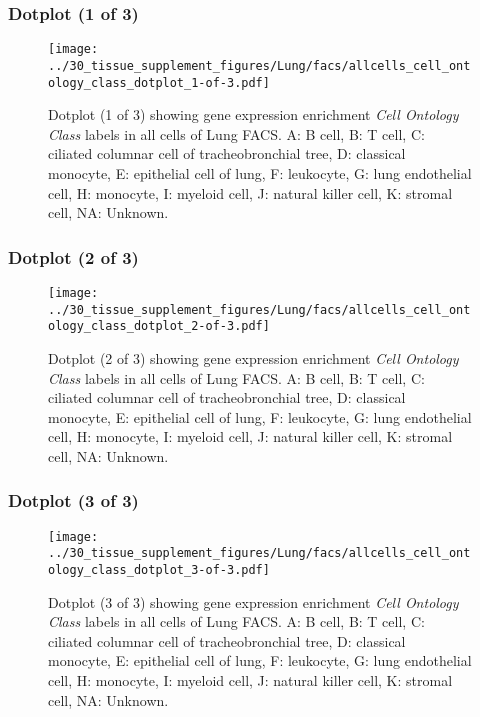 \clearpage

\subsubsection{Dotplot (1 of 3)}
\begin{figure}[h]
\centering
\texttt{[image: ../30\_tissue\_supplement\_figures/Lung/facs/allcells\_cell\_ontology\_class\_dotplot\_1-of-3.pdf]}

\caption{ Dotplot (1 of 3)  showing gene expression enrichment \emph{Cell Ontology Class} labels in all cells of Lung FACS. A: B cell, B: T cell, C: ciliated columnar cell of tracheobronchial tree, D: classical monocyte, E: epithelial cell of lung, F: leukocyte, G: lung endothelial cell, H: monocyte, I: myeloid cell, J: natural killer cell, K: stromal cell, NA: Unknown.}
\end{figure}


\clearpage

\subsubsection{Dotplot (2 of 3)}
\begin{figure}[h]
\centering
\texttt{[image: ../30\_tissue\_supplement\_figures/Lung/facs/allcells\_cell\_ontology\_class\_dotplot\_2-of-3.pdf]}

\caption{ Dotplot (2 of 3)  showing gene expression enrichment \emph{Cell Ontology Class} labels in all cells of Lung FACS. A: B cell, B: T cell, C: ciliated columnar cell of tracheobronchial tree, D: classical monocyte, E: epithelial cell of lung, F: leukocyte, G: lung endothelial cell, H: monocyte, I: myeloid cell, J: natural killer cell, K: stromal cell, NA: Unknown.}
\end{figure}


\clearpage

\subsubsection{Dotplot (3 of 3)}
\begin{figure}[h]
\centering
\texttt{[image: ../30\_tissue\_supplement\_figures/Lung/facs/allcells\_cell\_ontology\_class\_dotplot\_3-of-3.pdf]}

\caption{ Dotplot (3 of 3)  showing gene expression enrichment \emph{Cell Ontology Class} labels in all cells of Lung FACS. A: B cell, B: T cell, C: ciliated columnar cell of tracheobronchial tree, D: classical monocyte, E: epithelial cell of lung, F: leukocyte, G: lung endothelial cell, H: monocyte, I: myeloid cell, J: natural killer cell, K: stromal cell, NA: Unknown.}
\end{figure}


